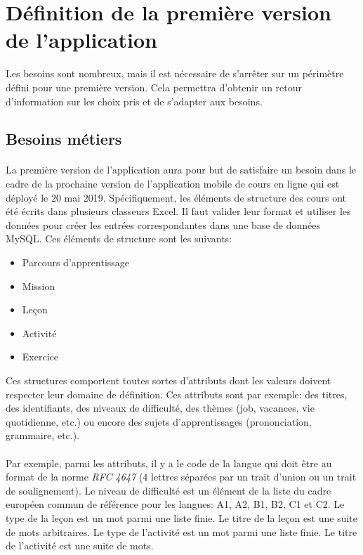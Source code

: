 \section{Définition de la première version de l'application}
\label{sec:first-version-definition}

Les besoins sont nombreux, mais il est nécessaire de s'arrêter sur un périmètre défini pour une première version.
Cela permettra d'obtenir un retour d'information sur les choix pris et de s'adapter aux besoins.

\subsection{Besoins métiers}
\label{subsec:business-needs}

\paragraph{}
La première version de l'application aura pour but de satisfaire un besoin dans le cadre de la prochaine version de l'application mobile de cours en ligne qui est déployé le 20 mai 2019.
Spécifiquement, les éléments de structure des cours ont été écrits dans plusieurs classeurs Excel.
Il faut valider leur format et utiliser les données pour créer les entrées correspondantes dans une base de données MySQL.
Ces éléments de structure sont les suivants:
\begin{itemize}
    \item Parcours d'apprentissage
    \item Mission
    \item Leçon
    \item Activité
    \item Exercice
\end{itemize}

Ces structures comportent toutes sortes d'attributs dont les valeurs doivent respecter leur domaine de définition.
Ces attributs sont par exemple: des titres, des identifiants, des niveaux de difficulté, des thèmes (job, vacances, vie quotidienne, etc.) ou encore des sujets d'apprentissages (prononciation, grammaire, etc.).

\paragraph{}
Par exemple, parmi les attributs, il y a le code de la langue qui doit être au format de la norme \textit{RFC 4647}\cite{davis_matching_nodate} (4 lettres séparées par un trait d'union ou un trait de soulignement).
Le niveau de difficulté est un élément de la liste du cadre européen commun de référence pour les langues\cite{noauthor_cadre_nodate}: A1, A2, B1, B2, C1 et C2.
Le type de la leçon est un mot parmi une liste finie.
Le titre de la leçon est une suite de mots arbitraires.
Le type de l'activité est un mot parmi une liste finie.
Le titre de l'activité est une suite de mots.

